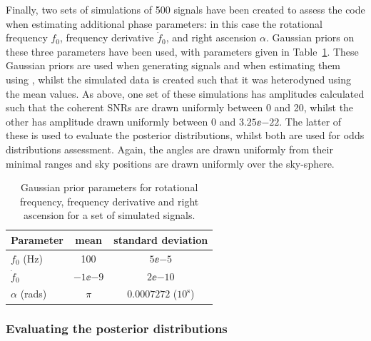 Finally, two sets of simulations of 500 signals have been created to assess the code when estimating additional phase parameters: in this case
the rotational frequency $f_0$, frequency derivative $\dot{f}_0$, and right ascension $\alpha$. Gaussian priors on these three parameters have been
used, with parameters given in Table~\ref{tab:gaussianpriors}. These Gaussian priors are used when generating signals and when estimating them
using \lppen, whilst the simulated data is created such that it was heterodyned using the mean values. As above, one set of these simulations has amplitudes 
calculated such that the coherent SNRs are drawn uniformly between 0 and 20, whilst the other has amplitude drawn uniformly between 0 and $3.25\ee{-22}$.
The latter of these is used to evaluate the posterior distributions, whilst both are used for odds distributions assessment. Again, the angles are drawn
uniformly from their minimal ranges and sky positions are drawn uniformly over the sky-sphere.

\begin{table}[!hptb]
\caption{Gaussian prior parameters for rotational frequency, frequency derivative and right ascension for a set of simulated signals.
\label{tab:gaussianpriors}}
\begin{center}
\begin{tabular}{l | c c}
\hline
Parameter & mean & standard deviation \\                      
\hline
\hline
$f_0$ (Hz) & 100 & $5\ee{-5}$ \\
$\dot{f}_0$ & $-1\ee{-9}$ & $2\ee{-10}$ \\
$\alpha$ (rads) & $\pi$ & $0.0007272$ ($10^{\text{s}}$) \\
\hline
\end{tabular}
\end{center}
\end{table}

\subsubsection{Evaluating the posterior distributions}\label{sec:ppplots}

